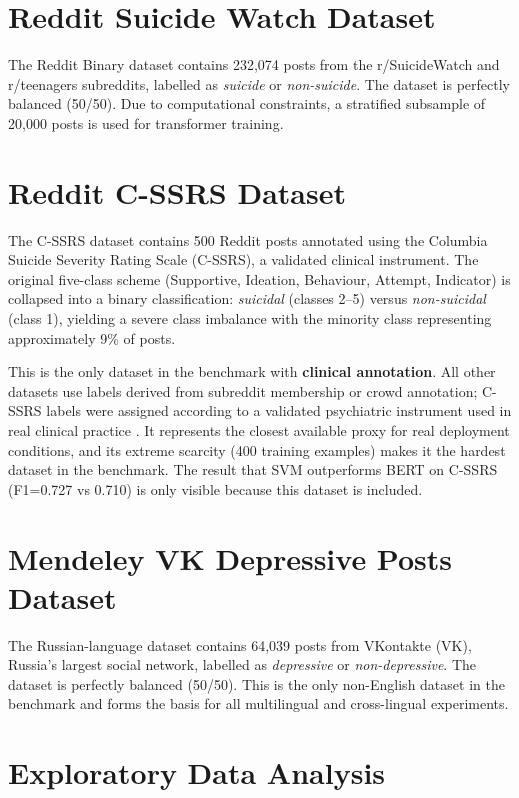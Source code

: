 \documentclass[12pt, a4paper, oneside]{report}
\begin{document}
\section{Reddit Suicide Watch Dataset}

The Reddit Binary dataset contains 232,074 posts from the r/SuicideWatch and r/teenagers subreddits, labelled as \textit{suicide} or \textit{non-suicide}. The dataset is perfectly balanced (50/50). Due to computational constraints, a stratified subsample of 20,000 posts is used for transformer training.

\section{Reddit C-SSRS Dataset}

The C-SSRS dataset contains 500 Reddit posts annotated using the Columbia Suicide Severity Rating Scale (C-SSRS), a validated clinical instrument. The original five-class scheme (Supportive, Ideation, Behaviour, Attempt, Indicator) is collapsed into a binary classification: \textit{suicidal} (classes 2--5) versus \textit{non-suicidal} (class 1), yielding a severe class imbalance with the minority class representing approximately 9\% of posts.

This is the only dataset in the benchmark with \textbf{clinical annotation}. All other datasets use labels derived from subreddit membership or crowd annotation; C-SSRS labels were assigned according to a validated psychiatric instrument used in real clinical practice \citep{gaur2019knowledge}. It represents the closest available proxy for real deployment conditions, and its extreme scarcity (400 training examples) makes it the hardest dataset in the benchmark. The result that SVM outperforms BERT on C-SSRS (F1=0.727 vs 0.710) is only visible because this dataset is included.

\section{Mendeley VK Depressive Posts Dataset}

The Russian-language dataset contains 64,039 posts from VKontakte (VK), Russia's largest social network, labelled as \textit{depressive} or \textit{non-depressive}. The dataset is perfectly balanced (50/50). This is the only non-English dataset in the benchmark and forms the basis for all multilingual and cross-lingual experiments.

\section{Exploratory Data Analysis}
\end{document}
